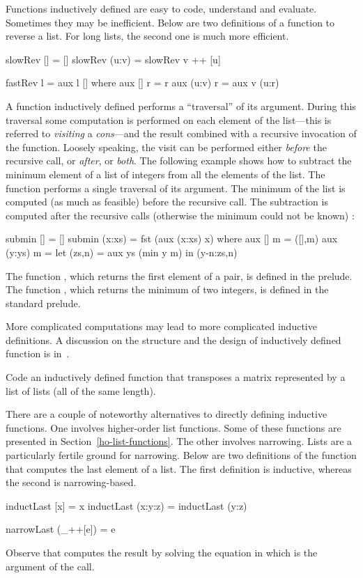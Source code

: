 Functions inductively defined are easy
to code, understand and evaluate.  Sometimes they may be inefficient.
Below are two definitions of a function to reverse a list.
For long lists, the second one is much more efficient.
%
\begin{curry}
slowRev [] = []
slowRev (u:v) = slowRev v ++ [u]

fastRev l = aux l []
  where aux [] r = r
        aux (u:v) r = aux v (u:r)
\end{curry}
%
A function inductively defined performs a ``traversal'' of its argument.
During this traversal some computation is performed on each
element of the list---this is referred to \emph{visiting}
a \emph{cons}---and the result combined with a
recursive invocation of the function.
Loosely speaking, the visit
can be performed either \emph{before} the recursive call,
or \emph{after}, or \emph{both}.
The following example shows how to subtract the minimum element of
a list of integers from all the elements of the list.
The function performs a single traversal of its argument.
The minimum of the list is computed (as much as feasible) before
the recursive call.
The subtraction is computed after the recursive
calls (otherwise the minimum could not be known)
:
%
\begin{curry}
submin []     = []
submin (x:xs) = fst (aux (x:xs) x)
  where aux []     m = ([],m)
        aux (y:ys) m = let (zs,n) = aux ys (min y m)
                        in (y-n:zs,n)
\end{curry}
%
The function , which returns the first element of a pair,
is defined in the prelude.
The function , which returns the minimum of two
integers, is defined in the standard prelude.

More complicated computations may lead to more complicated
inductive definitions. A discussion on the structure
and the design of inductively defined function is in~\cite{Antoy92ALP}.
%
\begin{exercise}
Code an inductively defined function that transposes a matrix
represented by a list of lists (all of the same length).
\end{exercise}
%
There are a couple of noteworthy alternatives to directly defining
inductive functions.  One involves higher-order list functions.
Some of these functions are presented in Section~\ref{ho-list-functions}.
The other involves narrowing.
Lists are a particularly fertile ground for narrowing.
Below are two definitions of the function that computes the
last element of a list.  The first definition is inductive,
whereas the second is narrowing-based. 
%
\begin{curry}
inductLast [x]     = x
inductLast (x:y:z) = inductLast (y:z)

narrowLast (_++[e]) = e
\end{curry}
%
Observe that  computes the result by solving the
equation  in which  is the argument of
the call.
%


